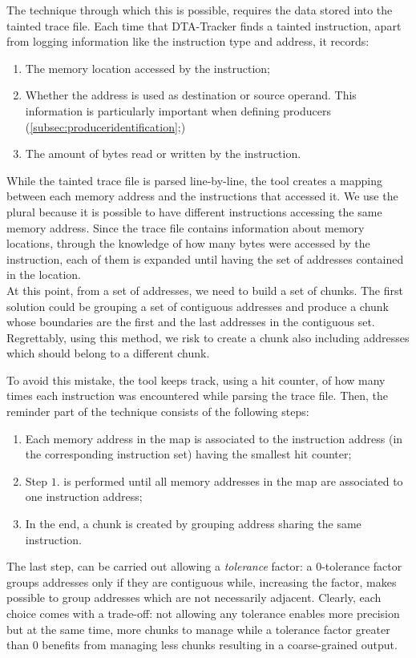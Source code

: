 \documentclass[LaM,binding=0.6cm]{sapthesis}
\begin{document}
\noindent
The technique through which this is possible, requires the data stored into the tainted trace file. Each time that {\sf DTA-Tracker} finds a tainted instruction, apart from logging information like the instruction type and address, it records:
\begin{enumerate}
\item The memory location accessed by the instruction;
\item Whether the address is used as destination or source operand. This information is particularly important when defining producers (\autoref{subsec:produceridentification};)
\item The amount of bytes read or written by the instruction.
\end{enumerate}
While the tainted trace file is parsed line-by-line, the tool creates a mapping between each memory address and the instructions that accessed it. We use the plural because it is possible to have different instructions accessing the same memory address. Since the trace file contains information about memory locations, through the knowledge of how many bytes were accessed by the instruction, each of them is expanded until having the set of addresses contained in the location.\\

At this point, from a set of addresses, we need to build a set of chunks. The first solution could be grouping a set of contiguous addresses and produce a chunk whose boundaries are the first and the last addresses in the contiguous set. Regrettably, using this method, we risk to create a chunk also including addresses which should belong to a different chunk.

To avoid this mistake, the tool keeps track, using a hit counter, of how many times each instruction was encountered while parsing the trace file. Then, the reminder part of the technique consists of the following steps:
\begin{enumerate}
\item Each memory address in the map is associated to the instruction address (in the corresponding instruction set) having the smallest hit counter;
\item Step $1.$ is performed until all memory addresses in the map are associated to one instruction address;
\item In the end, a chunk is created by grouping address sharing the same instruction.
\end{enumerate} 
The last step, can be carried out allowing a \textit{tolerance} factor: a $0$-tolerance factor groups addresses only if they are contiguous while, increasing the factor, makes possible to group addresses which are not necessarily adjacent. Clearly, each choice comes with a trade-off: not allowing any tolerance enables more precision but at the same time, more chunks to manage while a tolerance factor greater than $0$ benefits from managing less chunks resulting in a coarse-grained output.\\
\end{document}
